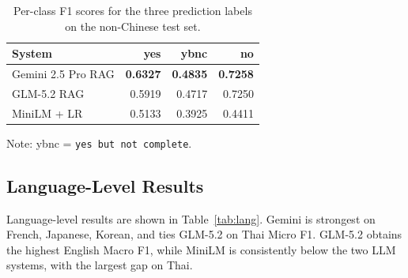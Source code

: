 \documentclass[sigconf,article]{acmart}
\begin{document}
\begin{table}[t]
\caption{Per-class F1 scores for the three prediction labels on the non-Chinese test set.}
\label{tab:class}
\centering
\begin{tabular}{lrrr}
\toprule
System & yes & ybnc & no \\
\midrule
Gemini 2.5 Pro RAG & \textbf{0.6327} & \textbf{0.4835} & \textbf{0.7258} \\
GLM-5.2 RAG & 0.5919 & 0.4717 & 0.7250 \\
MiniLM + LR & 0.5133 & 0.3925 & 0.4411 \\
\bottomrule
\end{tabular}
\begin{flushleft}
\small Note: ybnc = \texttt{yes but not complete}.
\end{flushleft}
\end{table}

\subsection{Language-Level Results}
Language-level results are shown in Table~\ref{tab:lang}. Gemini is strongest on French, Japanese, Korean, and ties GLM-5.2 on Thai Micro F1. GLM-5.2 obtains the highest English Macro F1, while MiniLM is consistently below the two LLM systems, with the largest gap on Thai.

\begin{table}[!t]
\caption{Language-level Micro F1 and Macro F1 results for each evaluated non-Chinese language.}
\label{tab:lang}
\centering
\scriptsize
\setlength{\tabcolsep}{2pt}
\end{table}
\end{document}
